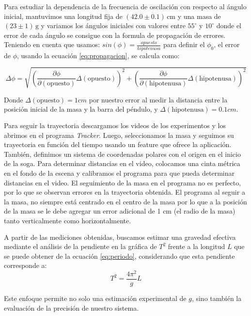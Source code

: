 \documentclass[12pt,a4]{article}
\begin{document}
Para estudiar la dependencia de la frecuencia de oscilación con respecto al ángulo inicial, mantuvimos una longitud fija de $(42.0 \pm 0.1) \, \text{cm}$ y una masa de $(23 \pm 1) \, \text{g}$ y variamos los ángulos iniciales con valores entre 
$55^\circ$ y $10^\circ$ donde el error de cada ángulo se consigue con la formula de propagación de errores. 
Teniendo en cuenta que usamos: $sin(\phi) = \frac{opuesto}{hipotenusa}$ para definir el $\phi_0$, el error de $\phi$, usando la ecuación \ref{eq:propagacion}, se calcula como:

\begin{equation}
    \Delta \phi = \sqrt{\left( \frac{\partial \phi}{\partial (\text{opuesto})} \Delta (\text{opuesto}) \right)^2 + \left( \frac{\partial \phi}{\partial (\text{hipotenusa})} \Delta (\text{hipotenusa}) \right)^2}
\end{equation}

Donde $\Delta (\text{opuesto}) = 1 cm$ por nuestro error al medir la distancia entre la posición inicial de la masa y la barra del péndulo,
 y $\Delta (\text{hipotenusa}) = 0.1 cm$.

Para seguir la trayectoria descargamos los videos de los experimentos y los abrimos en el programa \textit{Tracker}. 
Luego, seleccionamos la masa y seguimos su trayectoria en función del tiempo usando un feature que ofrece la aplicación. 
También, definimos un sistema de coordenadas polares con el origen en el inicio de la soga. 
Para determinar distancias en el video, colocamos una cinta métrica en el fondo de la escena y calibramos el programa para que pueda determinar distancias en el video. 
El seguimiento de la masa en el programa no es perfecto, por lo que se observan errores en la trayectoria obtenida.
El programa al seguir a la masa, no siempre está centrado en el centro de la masa por lo que a la posición de la masa se le debe agregar un error adicional de 1 cm (el radio de la masa) tanto verticalmente como horizontalmente.

A partir de las mediciones obtenidas, buscamos estimar una gravedad efectiva mediante el análisis de la pendiente en la gráfica de \( T^2 \) frente a la longitud \( L \) que se puede obtener de la ecuación \ref{eq:periodo}, considerando que esta pendiente corresponde a:
\begin{equation}
    T^2 = \frac{4 \pi^2}{g} L
    \label{eq:gravedad}
\end{equation}

Este enfoque permite no solo una estimación experimental de \( g \), sino también la evaluación de la precisión de nuestro sistema. 
\newpage
\end{document}
